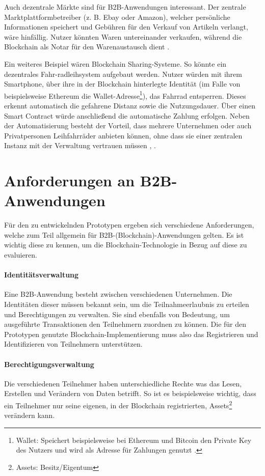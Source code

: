 Auch dezentrale Märkte sind für B2B-Anwendungen interessant. Der zentrale Marktplattformbetreiber (z. B. Ebay oder Amazon), welcher persönliche Informationen speichert und Gebühren für den Verkauf von Artikeln verlangt, wäre hinfällig. Nutzer könnten Waren untereinander verkaufen, während die Blockchain als Notar für den Warenaustausch dient \cite{BenHamidaBlockchainEnterpriseOverview2017}.

Ein weiteres Beispiel wären Blockchain Sharing-Systeme. So könnte ein dezentrales Fahr-radleihsystem aufgebaut werden. Nutzer würden mit ihrem Smartphone, über ihre in der Blockchain hinterlegte Identität (im Falle von beispielsweise Ethereum die Wallet-Adresse\footnote{Wallet: Speichert beispielsweise bei Ethereum und Bitcoin den Private Key des Nutzers und wird als Adresse für Zahlungen genutzt \cite[S.~61 ff.]{AntonopoulosMasteringbitcoin2015}.}), das Fahrrad entsperren. Dieses erkennt automatisch die gefahrene Distanz sowie die Nutzungsdauer. Über einen Smart Contract würde anschließend die automatische Zahlung erfolgen. Neben der Automatisierung besteht der Vorteil, dass mehrere Unternehmen oder auch Privatpersonen Leihfahrräder anbieten können, ohne dass sie einer zentralen Instanz mit der Verwaltung vertrauen müssen \cite{FutureFluxFestivalBlockchainBikes}, \cite{FischerIoTBlockchain}.

\section{Anforderungen an B2B-Anwendungen}
\label{sec:general-requirements}
Für den zu entwickelnden Prototypen ergeben sich verschiedene Anforderungen, welche zum Teil allgemein für B2B-(Blockchain)-Anwendungen gelten. Es ist wichtig diese zu kennen, um die Blockchain-Technologie in Bezug auf diese zu evaluieren.

\paragraph{Identitätsverwaltung}
Eine B2B-Anwendung besteht zwischen verschiedenen Unternehmen. Die Identitäten dieser müssen bekannt sein, um die Teilnahmeerlaubnis zu erteilen und Berechtigungen zu verwalten. Sie sind ebenfalls von Bedeutung, um ausgeführte Transaktionen den Teilnehmern zuordnen zu können. Die für den Prototypen genutzte Blockchain-Implementierung muss also das Registrieren und Identifizieren von Teilnehmern unterstützen.

\paragraph{Berechtigungsverwaltung}
Die verschiedenen Teilnehmer haben unterschiedliche Rechte was das Lesen, Erstellen und Verändern von Daten betrifft. So ist es beispielsweise wichtig, dass ein Teilnehmer nur seine eigenen, in der Blockchain registrierten, Assets\footnote{Assets: Besitz/Eigentum} verändern kann.


